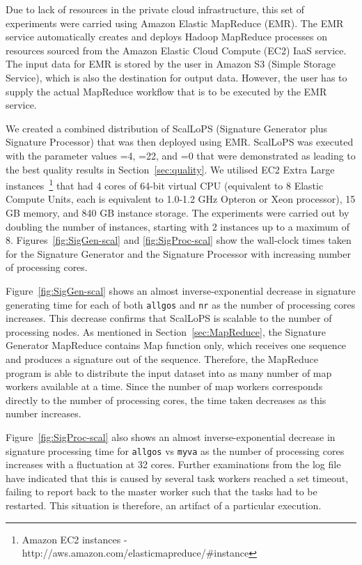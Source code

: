 \documentclass[titlepage]{csetr}
\begin{document}
Due to lack of resources in the private cloud infrastructure, this set of experiments were carried using Amazon Elastic MapReduce (EMR). The EMR service automatically creates and deploys Hadoop MapReduce processes on resources sourced from the Amazon Elastic Cloud Compute (EC2) IaaS service. The input data for EMR is stored by the user in Amazon S3 (Simple Storage Service), which is also the destination for output data. However, the user has to supply the actual MapReduce workflow that is to be executed by the EMR service.

We created a combined distribution of ScalLoPS (Signature Generator plus Signature Processor) that was then deployed using EMR. ScalLoPS was executed with the parameter values =4, =22, and =0 that were demonstrated as leading to the best quality results in Section~\ref{sec:quality}. We utilised EC2 Extra Large instances~\footnote{Amazon EC2 instances - http://aws.amazon.com/elasticmapreduce/\#instance} that had 4 cores of 64-bit virtual CPU (equivalent to 8 Elastic Compute Units, each is equivalent to 1.0-1.2 GHz Opteron or Xeon processor), 15 GB memory, and 840 GB instance storage. The experiments were carried out by doubling the number of instances, starting with 2 instances up to a maximum of 8. Figures~\ref{fig:SigGen-scal} and \ref{fig:SigProc-scal} show the wall-clock times taken for the Signature Generator and the Signature Processor with increasing number of processing cores.

Figure~\ref{fig:SigGen-scal} shows an almost inverse-exponential decrease in signature generating time for each of both \texttt{allgos} and \texttt{nr} as the number of processing cores increases. This decrease confirms that ScalLoPS is scalable to the number of processing nodes. As mentioned in Section~\ref{sec:MapReduce}, the Signature Generator MapReduce contains Map function only, which receives one sequence and produces a signature out of the sequence. Therefore, the MapReduce program is able to distribute the input dataset into as many number of map workers available at a time. Since the number of map workers corresponds directly to the number of processing cores, the time taken decreases as this number increases. 



Figure~\ref{fig:SigProc-scal} also shows an almost inverse-exponential decrease in signature processing time for \texttt{allgos} vs \texttt{myva} as the number of processing cores increases with a fluctuation at 32 cores. Further examinations from the log file have indicated that this is caused by several task workers reached a set timeout, failing to report back to the master worker such that the tasks had to be restarted. This situation is therefore, an artifact of a particular execution.
\end{document}
